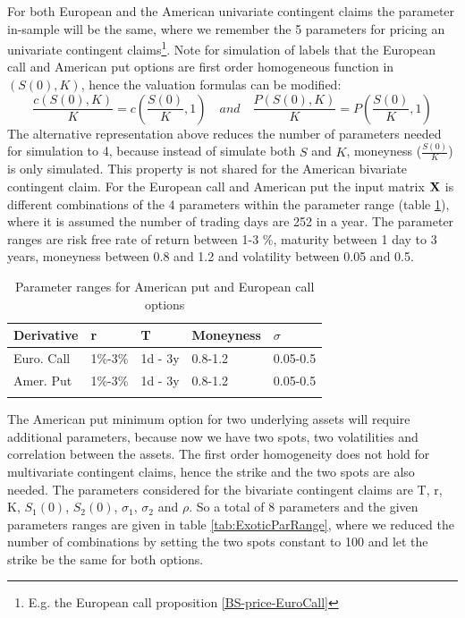 For both European and the American univariate contingent claims the parameter in-sample will be the same, where we remember the 5 parameters for pricing an  univariate contingent claims\footnote{E.g. the European call proposition \ref{BS-price-EuroCall}}. Note for simulation of labels that the European call and American put options are first order homogeneous function in $(S(0),K)$, hence the valuation formulas can be modified:
$$\frac{c(S(0),K)}{K}=c(\frac{S(0)}{K},1) \quad and \quad \frac{P(S(0),K)}{K}=P(\frac{S(0)}{K},1)$$
The alternative representation above reduces the number of parameters needed for simulation to 4, because instead of simulate both $S$ and $K$, moneyness ($\frac{S(0)}{K}$) is only  simulated. This property is not shared for the American bivariate contingent claim. For the European call and American put the input matrix $\mathbf{X}$ is different combinations of the 4 parameters within the parameter range (table \ref{tab:vanillaParRange}), where it is assumed the number of trading days are 252 in a year. The parameter ranges are risk free rate of return between 1-3 \%, maturity between 1 day to 3 years, moneyness between 0.8 and 1.2 and volatility between 0.05 and 0.5. \\

\begin{table}[th]
\caption[Parameter Ranges For MLPs]{Parameter ranges for American put and European call options}
\label{tab:vanillaParRange}
\centering
\begin{tabular}{l l l l l}
\toprule
\textbf{Derivative} & \textbf{r} & \textbf{T} & \textbf{Moneyness} & $\sigma$ \\
\midrule
Euro. Call & 1\%-3\% & 1d - 3y & 0.8-1.2 & 0.05-0.5\\ 
Amer. Put & 1\%-3\% & 1d - 3y & 0.8-1.2 & 0.05-0.5\\ 
\bottomrule\\
\end{tabular}
\end{table}

The American put minimum option for two underlying assets will require additional parameters, because now we have two spots, two volatilities and correlation between the assets. The first order homogeneity does not hold for multivariate contingent claims, hence the strike and the two spots are also needed. The parameters considered for the bivariate contingent claims are T, r, K, $S_1(0)$, $S_2(0)$, $\sigma_1$, $\sigma_2$ and $\rho$. So a total of 8 parameters and the given parameters ranges are given in table \ref{tab:ExoticParRange}, where we reduced the number of combinations by setting the two spots constant to 100 and let the strike be the same for both options.\\
   
